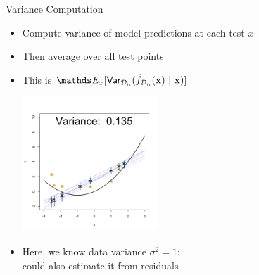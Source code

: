 \documentclass[11pt,compress,t,notes=noshow, xcolor=table]{beamer}
\begin{document}
\begin{vbframe} {Variance Computation}

\begin{itemize}
\item Compute variance of model predictions at each test $x$
\item Then average over all test points
\item This is 
$
\E_{x} [\var_{\D_n} (\fh_{\D_n}(\xv) ~|~\xv ) ]
$

\begin{center}
  \includegraphics[width = 0.4\textwidth]{figure/bias_variance_decomposition-linear_model_variance.png}
\end{center}

\item Here, we know data variance $\sigma^2=1$;\\
could also estimate it from residuals

\end{itemize}


\end{vbframe} 
\end{document}
